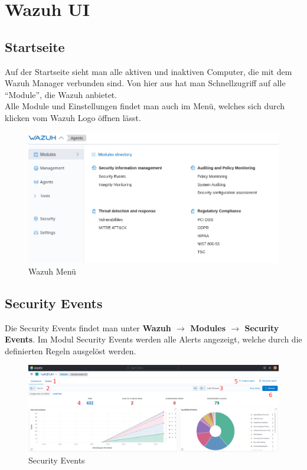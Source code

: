 \chapter{Wazuh UI}
\section{Startseite}
Auf der Startseite sieht man alle aktiven und inaktiven Computer, die mit dem Wazuh Manager verbunden sind.
Von hier aus hat man Schnellzugriff auf alle ``Module'', die Wazuh anbietet.\\

Alle Module und Einstellungen findet man auch im Menü, welches sich durch klicken vom Wazuh Logo öffnen lässt.
\begin{figure}[H]
    \centering
    \includegraphics[width=\linewidth]{../img/wazuh-menu.png}
    \caption{Wazuh Menü}
\end{figure}

\section{Security Events}
Die Security Events findet man unter \textbf{Wazuh $\rightarrow$ Modules $\rightarrow$ Security Events}.
Im Modul Security Events werden alle Alerts angezeigt, welche durch die definierten Regeln ausgelöst werden.

\begin{figure}[H]
    \centering
    \includegraphics[width=\linewidth]{../img/wazuh-se-1.png}
    \caption{Security Events}
\end{figure}

